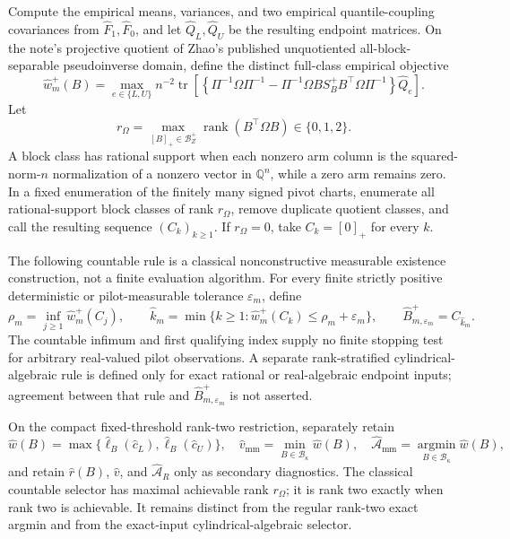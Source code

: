 Compute the empirical means, variances, and two empirical quantile-coupling covariances from \(\widehat F_1,\widehat F_0\), and let \(\widehat Q_L,\widehat Q_U\) be the resulting endpoint matrices.  On the note's projective quotient of Zhao's published unquotiented all-block-separable pseudoinverse domain, define the distinct full-class empirical objective
\[
\widehat w_m^+(B)=
\max_{e\in\{L,U\}}n^{-2}\operatorname{tr}\!\left[
\left\{\Pi^{-1}\Omega\Pi^{-1}
-\Pi^{-1}\Omega B S_B^+B^{\top}\Omega\Pi^{-1}\right\}\widehat Q_e
\right].
\]
Let
\[
r_\Omega=\max_{[B]_+\in\mathcal B_Z^+}\operatorname{rank}(B^{\top}\Omega B)\in\{0,1,2\}.
\]
A block class has rational support when each nonzero arm column is the squared-norm-\(n\) normalization of a nonzero vector in \(\mathbb Q^n\), while a zero arm remains zero.  In a fixed enumeration of the finitely many signed pivot charts, enumerate all rational-support block classes of rank \(r_\Omega\), remove duplicate quotient classes, and call the resulting sequence \((C_k)_{k\ge1}\).  If \(r_\Omega=0\), take \(C_k=[0]_+\) for every \(k\).

The following countable rule is a classical nonconstructive measurable existence construction, not a finite evaluation algorithm.  For every finite strictly positive deterministic or pilot-measurable tolerance \(\varepsilon_m\), define
\[
 \rho_m=\inf_{j\ge1}\widehat w_m^+(C_j),
 \qquad
 \widehat k_m=
 \min\{k\ge1:\widehat w_m^+(C_k)\le\rho_m+\varepsilon_m\},
 \qquad
 \widehat B_{m,\varepsilon_m}^+=C_{\widehat k_m}.
\]
The countable infimum and first qualifying index supply no finite stopping test for arbitrary real-valued pilot observations.  A separate rank-stratified cylindrical-algebraic rule is defined only for exact rational or real-algebraic endpoint inputs; agreement between that rule and \(\widehat B_{m,\varepsilon_m}^+\) is not asserted.

On the compact fixed-threshold rank-two restriction, separately retain
\[
\widehat w(B)=\max\{\widehat\ell_B(\widehat c_L),\widehat\ell_B(\widehat c_U)\},
\quad
\widehat v_{\mathrm{mm}}=\min_{B\in\mathcal B_\kappa}\widehat w(B),
\quad
\widehat{\mathcal A}_{\mathrm{mm}}=\operatorname*{argmin}_{B\in\mathcal B_\kappa}\widehat w(B),
\]
and retain \(\widehat r(B)\), \(\widehat v\), and \(\widehat{\mathcal A}_R\) only as secondary diagnostics.  The classical countable selector has maximal achievable rank \(r_\Omega\); it is rank two exactly when rank two is achievable.  It remains distinct from the regular rank-two exact argmin and from the exact-input cylindrical-algebraic selector.